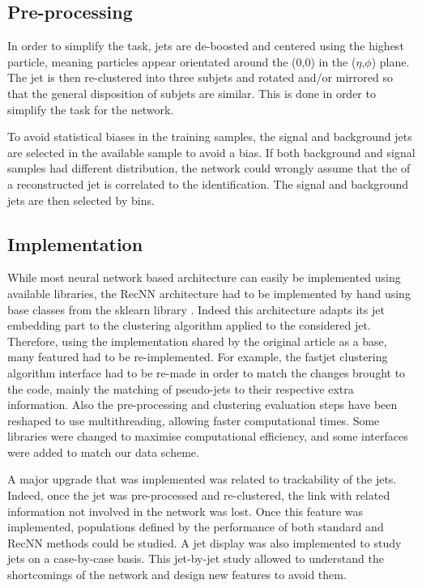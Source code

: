 \subsection{Pre-processing}

In order to simplify the task, jets are de-boosted and centered using the highest \pt particle, meaning particles appear orientated around the (0,0) in the ($\eta$,$\phi$) plane. The jet is then re-clustered into three subjets and rotated and/or mirrored so that the general disposition of subjets are similar. This is done in order to simplify the task for the network.

To avoid statistical biases in the training samples, the signal and background jets are selected in the available sample to avoid a \pt bias. If both background and signal samples had different \pt distribution, the network could wrongly assume that the \pt of a reconstructed jet is correlated to the identification. The signal and background jets are then selected by \pt bins.

\subsection{Implementation}

While most neural network based architecture can easily be implemented using available libraries, the RecNN architecture had to be implemented by hand using base classes from the sklearn library \cite{scikit-learn}. Indeed this architecture adapts its jet embedding part to the clustering algorithm applied to the considered jet. Therefore, using the implementation shared by the original article \cite{Louppe:2017ipp} as a base, many featured had to be re-implemented. For example, the fastjet \cite{Cacciari:2011ma} clustering algorithm interface had to be re-made in order to match the changes brought to the code, mainly the matching of pseudo-jets to their respective extra information. Also the pre-processing and clustering evaluation steps have been reshaped to use multithreading, allowing faster computational times. Some libraries were changed to maximise computational efficiency, and some interfaces were added to match our data scheme.

A major upgrade that was implemented was related to trackability of the jets. Indeed, once the jet was pre-processed and re-clustered, the link with related information not involved in the network was lost. Once this feature was implemented, populations defined by the performance of both standard and RecNN methods could be studied. A jet display was also implemented to study jets on a case-by-case basis. This jet-by-jet study allowed to understand the shortcomings of the network and design new features to avoid them.

